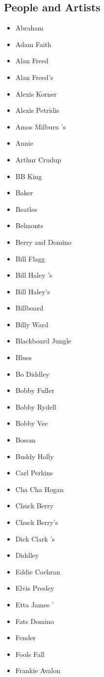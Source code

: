 \documentclass[12pt,a4paper]{article}
\begin{document}
\subsection{People and Artists}
\begin{itemize}
  \item Abraham
  \item Adam Faith
  \item Alan Freed
  \item Alan Freed's
  \item Alexis Korner
  \item Alexis Petridis
  \item Amos Milburn 's
  \item Annie
  \item Arthur Crudup
  \item BB King
  \item Baker
  \item Beatles
  \item Belmonts
  \item Berry and Domino
  \item Bill Flagg
  \item Bill Haley 's
  \item Bill Haley's
  \item Billboard
  \item Billy Ward
  \item Blackboard Jungle
  \item Blues
  \item Bo Diddley
  \item Bobby Fuller
  \item Bobby Rydell
  \item Bobby Vee
  \item Bosom
  \item Buddy Holly
  \item Carl Perkins
  \item Cha Cha Hogan
  \item Chuck Berry
  \item Chuck Berry's
  \item Dick Clark 's
  \item Diddley
  \item Eddie Cochran
  \item Elvis Presley
  \item Etta James '
  \item Fats Domino
  \item Fender
  \item Fools Fall
  \item Frankie Avalon

\end{itemize}
\end{document}
